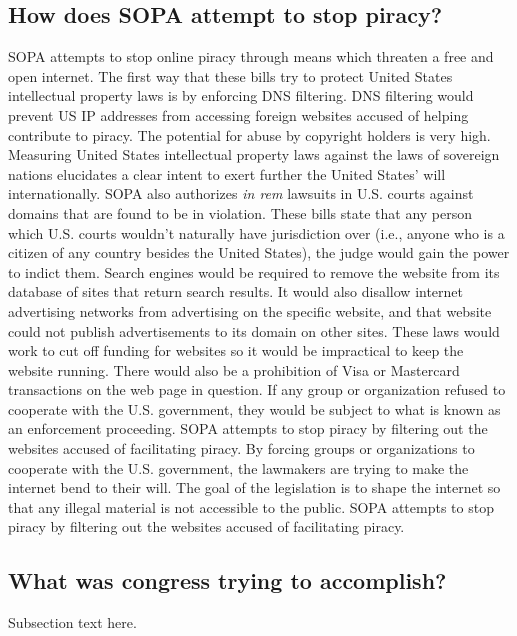 \documentclass[11pt,journal,compsoc]{IEEEtran}
\begin{document}
\subsection{How does SOPA attempt to stop piracy?}
SOPA attempts to stop online piracy through means which threaten a free and open internet. The first way that these bills try to protect United States intellectual property laws is by enforcing DNS filtering. DNS filtering would prevent US IP addresses from accessing foreign websites accused of helping contribute to piracy. The potential for abuse by copyright holders is very high. Measuring United States intellectual property laws against the laws of sovereign nations elucidates a clear intent to exert further the United States' will internationally. SOPA also authorizes \textit{in rem} lawsuits in U.S. courts against domains that are found to be in violation. These bills state that any person which U.S. courts wouldn't naturally have jurisdiction over (i.e., anyone who is a citizen of any country besides the United States), the judge would gain the power to indict them. Search engines would be required to remove the website from its database of sites that return search results. It would also disallow internet advertising networks from advertising on the specific website, and that website could not publish advertisements to its domain on other sites. These laws would work to cut off funding for websites so it would be impractical to keep the website running. There would also be a prohibition of Visa or Mastercard transactions on the web page in question. If any group or organization refused to cooperate with the U.S. government, they would be subject to what is known as an enforcement proceeding. SOPA attempts to stop piracy by filtering out the websites accused of facilitating piracy. By forcing groups or organizations to cooperate with the U.S. government, the lawmakers are trying to make the internet bend to their will. The goal of the legislation is to shape the internet so that any illegal material is not accessible to the public. SOPA attempts to stop piracy by filtering out the websites accused of facilitating piracy.

\subsection{What was congress trying to accomplish?}
Subsection text here.
\end{document}
